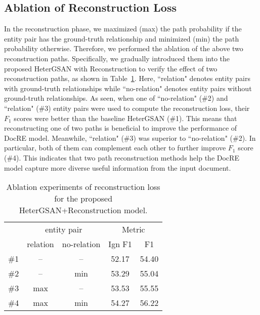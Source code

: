 \documentclass[letterpaper]{article} \usepackage{aaai21}  \usepackage{times}  \usepackage{helvet} \usepackage{courier}  \usepackage[hyphens]{url}  \usepackage{graphicx} \urlstyle{rm} \def\UrlFont{\rm}  \usepackage{natbib}  \usepackage{caption} \frenchspacing  \setlength{\pdfpagewidth}{8.5in}  \setlength{\pdfpageheight}{11in}  \usepackage{amsmath}
\begin{document}
\subsection{Ablation of Reconstruction Loss}
In the reconstruction phase, we maximized (max) the path probability if the entity pair has the ground-truth relationship and minimized (min) the path probability otherwise.
Therefore, we performed the ablation of the above two reconstruction paths.
Specifically, we gradually introduced them into the proposed HeterGSAN with Reconstruction to verify the effect of two reconstruction paths, as shown in Table~\ref{tab4:pathablation}.
Here, ``relation" denotes entity pairs with ground-truth relationships while ``no-relation" denotes entity pairs without ground-truth relationships.
As seen, when one of ``no-relation" (\#2) and ``relation" (\#3) entity pairs were used to compute the reconstruction loss, their $F_1$ scores were better than the baseline HeterGSAN (\#1).
This means that reconstructing one of two paths is beneficial to improve the performance of DocRE model.
Meanwhile, ``relation" (\#3) was superior to ``no-relation" (\#2).
In particular, both of them can complement each other to further improve $F_1$ score (\#4).
This indicates that two path reconstruction methods help the DocRE model capture more diverse useful information from the input document.
\begin{table}[h]
	\begin{center}
		\begin{tabular}{c|cc|c|c}
& \multicolumn{2}{c}{entity pair} & \multicolumn{2}{c}{Metric} \\ \cline{2-5}
			& relation        & no-relation          & Ign F1        & F1     \\ \hline
			\#1 & --              & --      &  52.17    & 54.40    \\
			\#2 & --              & min     &  53.29    & 55.04    \\
			\#3 & max             & --      &  53.53    & 55.55    \\
			\#4 & max             & min     &  54.27    & 56.22    \\ \end{tabular}
	\end{center}
	\caption{\label{tab4:pathablation}Ablation experiments of reconstruction loss for the proposed HeterGSAN+Reconstruction model.}
\end{table}
\end{document}
